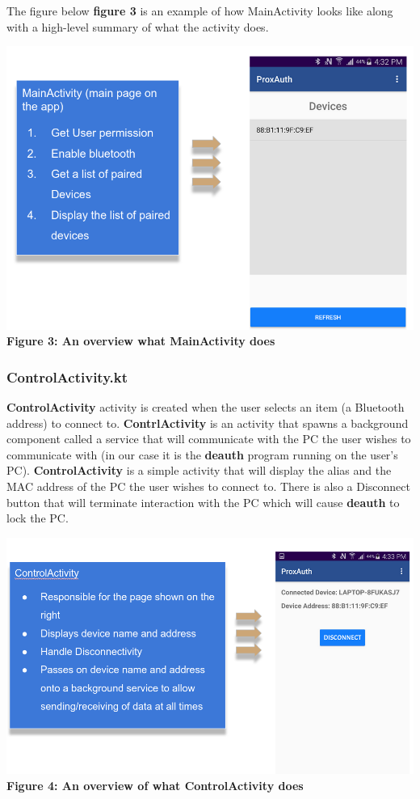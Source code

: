 \documentclass[letterpaper,twocolumn,10pt]{article}
\begin{document}
{{The figure below \textbf{figure 3} is an example of how MainActivity looks like along with a high-level summary of what the activity does.

\includegraphics[scale=0.25]{main-activity.png}
\small \textbf{Figure 3: An overview what MainActivity does}
\normalsize

\subsubsection{ControlActivity.kt}
\textbf{ControlActivity} activity is created when the user selects an item (a Bluetooth address) to connect to. \textbf{ContrlActivity} is an activity that spawns a background component called a service that will communicate with the PC the user wishes to communicate with (in our case it is the \textbf{deauth} program running on the user's PC). \textbf{ControlActivity} is a simple activity that will display the alias and the MAC address of the PC the user wishes to connect to. There is also a Disconnect button that will terminate interaction with the PC which will cause \textbf{deauth} to lock the PC.

\includegraphics[scale=0.2]{control-activity.png}
\small \textbf{Figure 4: An overview of what ControlActivity does}
\normalsize

}}
\end{document}
